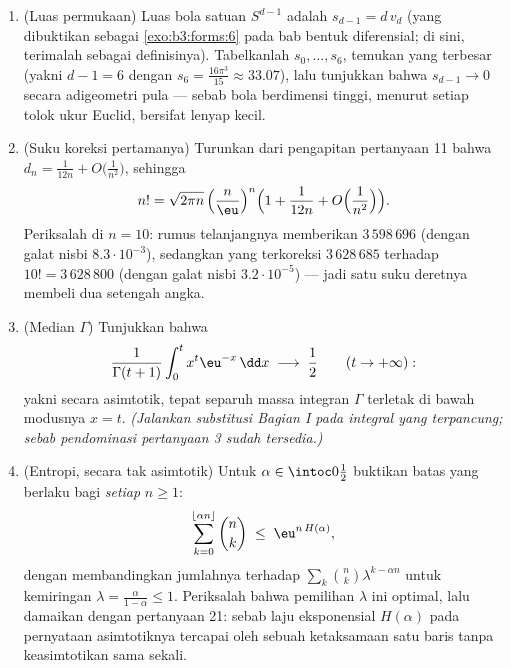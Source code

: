 \begin{problem}
\begin{enumerate}[resume]
        \emph{entropi} $H$ --- lalu periksalah bahwa $\alpha =
        \frac12$ memulihkan pertanyaan 5, dan bahwa $H(\alpha) <
        \ln2$ untuk $\alpha \neq \frac12$ (sehingga binomial yang tak berpusat
        bersifat eksponensial terabaikan di dalam $2^n$).
  \item (Luas permukaan) Luas bola satuan $S^{d-1}$
        adalah $s_{d-1} = d\,v_d$ (yang dibuktikan sebagai
        \cref{exo:b3:forms:6} pada bab bentuk diferensial;
        di sini, terimalah sebagai definisinya). Tabelkanlah
        $s_0, \dots, s_6$, temukan yang terbesar (yakni $d - 1 =
        6$ dengan $s_6 = \frac{16\pi^3}{15} \approx 33.07$), lalu
        tunjukkan bahwa $s_{d-1} \to 0$ secara adigeometri pula ---
        sebab bola berdimensi tinggi, menurut setiap tolok ukur Euclid,
        bersifat lenyap kecil.
  \item (Suku koreksi pertamanya) Turunkan dari
        pengapitan pertanyaan 11 bahwa $d_n = \frac1{12n} +
        O\bigl(\frac1{n^2}\bigr)$, sehingga
        \[
        n! = \sqrt{2\pi n}\,\Bigl(\frac
        n\eu\Bigr)^{n}\Bigl(1 + \frac1{12n} +
        O\Bigl(\frac1{n^2}\Bigr)\Bigr).
        \]
        Periksalah di $n = 10$: rumus telanjangnya memberikan
        $3\,598\,696$ (dengan galat nisbi $8.3\cdot10^{-3}$),
        sedangkan yang terkoreksi $3\,628\,685$ terhadap $10! =
        3\,628\,800$ (dengan galat nisbi $3.2\cdot10^{-5}$) ---
        jadi satu suku deretnya membeli dua setengah angka.
  \item (Median $\Gamma$) Tunjukkan bahwa
        \[
        \frac{1}{\Gamma(t+1)}
        \int_0^{t} x^{t}\eu^{-x}\,\dd x
        \;\longrightarrow\; \frac12
        \qquad (t \to +\infty) :
        \]
        yakni secara asimtotik, tepat separuh massa
        integran $\Gamma$ terletak di bawah modusnya $x = t$.
        \emph{(Jalankan substitusi Bagian I pada integral yang
        terpancung; sebab pendominasi pertanyaan 3 sudah
        tersedia.)}
  \item (Entropi, secara tak asimtotik) Untuk $\alpha \in
        \intoc0{\frac12}$ buktikan batas yang berlaku bagi
        \emph{setiap} $n \geq 1$:
        \[
        \sum_{k=0}^{\lfloor\alpha n\rfloor}\binom nk
        \;\leq\; \eu^{n\,H(\alpha)} ,
        \]
        dengan membandingkan jumlahnya terhadap $\sum_k\binom
        nk\lambda^{k-\alpha n}$ untuk kemiringan $\lambda =
        \frac{\alpha}{1-\alpha} \leq 1$. Periksalah bahwa pemilihan
        $\lambda$ ini optimal, lalu damaikan dengan
        pertanyaan 21: sebab laju eksponensial $H(\alpha)$ pada
        pernyataan asimtotiknya tercapai oleh sebuah
        ketaksamaan satu baris tanpa keasimtotikan sama sekali.

\end{enumerate}
\end{problem}
